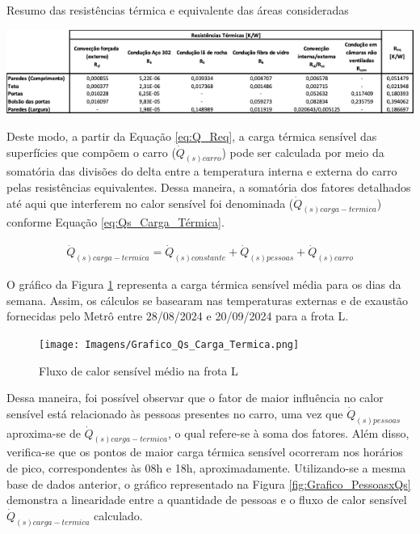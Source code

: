\documentclass[acronym,symbols,table]{fei}
\begin{document}
\begin{table}[!htb] 
 \centering
    \caption{Resumo das resistências térmica e equivalente das áreas consideradas}
    \includegraphics[width=0.9\linewidth]{Tabelas/Resistencias_Equivalentes.png}
    \label{tab:Resistencias_Equivalentes}
\end{table}

Deste modo, a partir da Equação \ref{eq:Q_Req}, a carga térmica sensível das superfícies que compõem o carro ($\dot{Q}_{(s)carro}$) pode ser calculada por meio da somatória das divisões do delta entre a temperatura interna e externa do carro pelas resistências equivalentes. Dessa maneira, a somatória dos fatores detalhados até aqui que interferem no calor sensível foi denominada ($\dot{Q}_{(s)carga-termica}$) conforme Equação \ref{eq:Qs_Carga_Térmica}.

\begin{equation} \label{eq:Qs_Carga_Térmica}
    \begin{aligned}
      \dot{Q}_{(s)carga-termica}=\dot{Q}_{(s)constante} + \dot{Q}_{(s)pessoas} + \dot{Q}_{(s)carro}
    \end{aligned}
\end{equation}

O gráfico da Figura \ref{fig:Grafico_Carga_Termica} representa a carga térmica sensível média para os dias da semana. Assim, os cálculos se basearam nas temperaturas externas e de exaustão fornecidas pelo Metrô entre 28/08/2024 e 20/09/2024 para a frota L.

\begin{figure}[!htb]
    \centering
    \caption{Fluxo de calor sensível médio na frota L}
    \texttt{[image: Imagens/Grafico\_Qs\_Carga\_Termica.png]}
    \label{fig:Grafico_Carga_Termica}
\end{figure}

Dessa maneira, foi possível observar que o fator de maior influência no calor sensível está relacionado às pessoas presentes no carro, uma vez que $\dot{Q}_{(s)pessoas}$ aproxima-se de $\dot{Q}_{(s)carga-termica}$, o qual refere-se à soma dos fatores. Além disso, verifica-se que os pontos de maior carga térmica sensível ocorreram nos horários de pico, correspondentes às 08h e 18h, aproximadamente. Utilizando-se a mesma base de dados anterior, o gráfico representado na Figura \ref{fig:Grafico_PessoasxQs} demonstra a linearidade entre a quantidade de pessoas e o fluxo de calor sensível $\dot{Q}_{(s)carga-termica}$ calculado.
\end{document}
